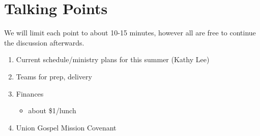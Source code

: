 \documentclass[10pt]{article}
\begin{document}
\section{Talking Points}
    We will limit each point to about 10-15 minutes, however all are free to continue the discussion afterwards.
    \begin{enumerate}
        \item{Current schedule/ministry plans for this summer (Kathy Lee)}
        \item{Teams for prep, delivery}
        \item{Finances}
            \begin{itemize}\item{about \$1/lunch}\end{itemize}
        \item{Union Gospel Mission Covenant}
    \end{enumerate}
\end{document}
